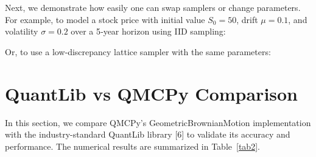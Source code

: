 \documentclass{article}
\begin{document}

Next, we demonstrate how easily one can swap samplers or change parameters.  For example, to model a stock price
with initial value $S_0=50$, drift $\mu=0.1$, and volatility $\sigma=0.2$ over a 5‐year horizon using IID sampling:


Or, to use a low‐discrepancy lattice sampler with the same parameters:




\section{QuantLib vs QMCPy Comparison}

In this section, we compare QMCPy's GeometricBrownianMotion implementation with the industry-standard QuantLib library [6] to validate its accuracy and performance. The numerical results are summarized in Table~\ref{tab2}.

\end{document}
